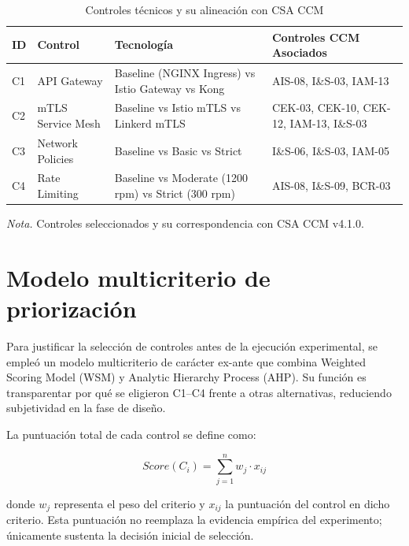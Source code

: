 \begin{table}[htbp]
\centering
\caption{Controles técnicos y su alineación con CSA CCM}
\label{tab:controles_ccm}
\renewcommand{\arraystretch}{1.3}

\begin{tabular}{p{2cm} p{3cm} p{4cm} p{6cm}}
\hline
\textbf{ID} & \textbf{Control} & \textbf{Tecnología} & \textbf{Controles CCM Asociados} \\
\hline

C1 & API Gateway & Baseline (NGINX Ingress) vs Istio Gateway vs Kong & AIS-08, I\&S-03, IAM-13 \\

C2 & mTLS Service Mesh & Baseline vs Istio mTLS vs Linkerd mTLS & CEK-03, CEK-10, CEK-12, IAM-13, I\&S-03 \\

C3 & Network Policies & Baseline vs Basic vs Strict & I\&S-06, I\&S-03, IAM-05 \\

C4 & Rate Limiting & Baseline vs Moderate (1200 rpm) vs Strict (300 rpm) & AIS-08, I\&S-09, BCR-03 \\

\hline
\end{tabular}

\vspace{0.2cm}
{\raggedright \small \textit{Nota.} Controles seleccionados y su correspondencia con CSA CCM v4.1.0.\par}

\end{table}

\section{Modelo multicriterio de priorización}

Para justificar la selección de controles antes de la ejecución experimental, se empleó un modelo multicriterio de carácter ex-ante que combina Weighted Scoring Model (WSM) y Analytic Hierarchy Process (AHP). Su función es transparentar por qué se eligieron C1--C4 frente a otras alternativas, reduciendo subjetividad en la fase de diseño.

La puntuación total de cada control se define como:

\begin{equation}
Score(C_i) = \sum_{j=1}^{n} w_j \cdot x_{ij}
\end{equation}

donde $w_j$ representa el peso del criterio y $x_{ij}$ la puntuación del control en dicho criterio. Esta puntuación no reemplaza la evidencia empírica del experimento; únicamente sustenta la decisión inicial de selección.

